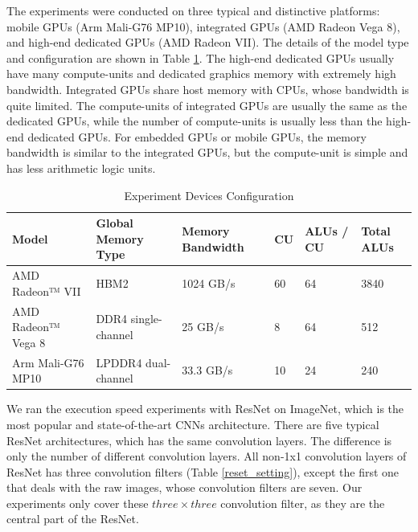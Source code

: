 \documentclass{article}
\begin{document}
The experiments were conducted on three typical and distinctive platforms: mobile GPUs (Arm Mali-G76 MP10), integrated GPUs (AMD Radeon Vega 8), and high-end dedicated GPUs (AMD Radeon VII). The details of the model type and configuration are shown in Table \ref{platform}. The high-end dedicated GPUs usually have many compute-units and dedicated graphics memory with extremely high bandwidth. Integrated GPUs share host memory with CPUs, whose bandwidth is quite limited. The compute-units of integrated GPUs are usually the same as the dedicated GPUs, while the number of compute-units is usually less than the high-end dedicated GPUs. For embedded GPUs or mobile GPUs, the memory bandwidth is similar to the integrated GPUs, but the compute-unit is simple and has less arithmetic logic units. 





\begin{table}[h]
\centering
\caption{Experiment Devices Configuration\label{platform}}
\begin{tabular}{l|l|l|l|l|l}
\hline
Model              & Global Memory Type  & Memory Bandwidth & CU & ALUs / CU & Total ALUs \\ \hline
AMD Radeon™ VII    & HBM2                & 1024 GB/s        & 60 & 64        & 3840       \\
AMD Radeon™ Vega 8 & DDR4 single-channel & 25 GB/s          & 8  & 64        & 512        \\
Arm Mali-G76 MP10       & LPDDR4 dual-channel & 33.3 GB/s        & 10 & 24        & 240        \\ \hline
\end{tabular}
\end{table}


We ran the execution speed experiments with ResNet on ImageNet, which is the most popular and state-of-the-art CNNs architecture. There are five typical ResNet architectures, which has the same convolution layers. The difference is only the number of different convolution layers. All non-1x1 convolution layers of ResNet has three convolution filters (Table \ref{reset_setting}), except the first one that deals with the raw images, whose convolution filters are seven. Our experiments only cover these $three \times three$ convolution filter, as they are the central part of the ResNet.
\end{document}
